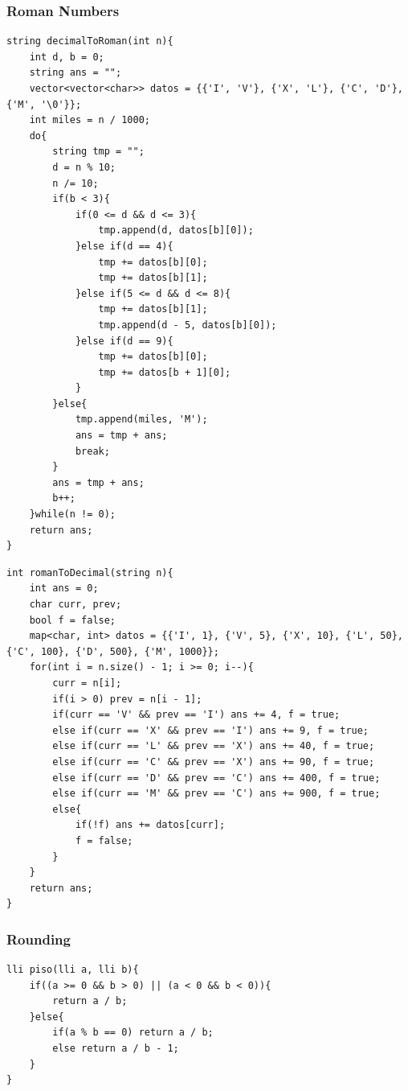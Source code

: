 \documentclass[twoside]{article}
\begin{document}
\begin{multicols*}{2}
\begin{verbatim}
\end{verbatim}

\subsubsectionfont{\large\bfseries\sffamily\underline}
\subsubsection*{Roman Numbers}
\begin{verbatim}
string decimalToRoman(int n){
	int d, b = 0;
	string ans = "";
	vector<vector<char>> datos = {{'I', 'V'}, {'X', 'L'}, {'C', 'D'}, {'M', '\0'}};
	int miles = n / 1000;
	do{
		string tmp = "";
		d = n % 10;
		n /= 10;
		if(b < 3){
			if(0 <= d && d <= 3){
				tmp.append(d, datos[b][0]);
			}else if(d == 4){
				tmp += datos[b][0];
				tmp += datos[b][1];
			}else if(5 <= d && d <= 8){
				tmp += datos[b][1];
				tmp.append(d - 5, datos[b][0]);
			}else if(d == 9){
				tmp += datos[b][0];
				tmp += datos[b + 1][0];
			}
		}else{
			tmp.append(miles, 'M');
			ans = tmp + ans;
			break;
		}
		ans = tmp + ans;
		b++;
	}while(n != 0);
	return ans;
}

\end{verbatim}
\vspace{-12pt}
\begin{verbatim}
int romanToDecimal(string n){
	int ans = 0;
	char curr, prev;
	bool f = false;
	map<char, int> datos = {{'I', 1}, {'V', 5}, {'X', 10}, {'L', 50}, {'C', 100}, {'D', 500}, {'M', 1000}};
	for(int i = n.size() - 1; i >= 0; i--){
		curr = n[i];
		if(i > 0) prev = n[i - 1];
		if(curr == 'V' && prev == 'I') ans += 4, f = true;
		else if(curr == 'X' && prev == 'I') ans += 9, f = true;
		else if(curr == 'L' && prev == 'X') ans += 40, f = true;
		else if(curr == 'C' && prev == 'X') ans += 90, f = true;
		else if(curr == 'D' && prev == 'C') ans += 400, f = true;
		else if(curr == 'M' && prev == 'C') ans += 900, f = true;
		else{
			if(!f) ans += datos[curr];
			f = false;
		}
	}
	return ans;
}

\end{verbatim}

\subsubsectionfont{\large\bfseries\sffamily\underline}
\subsubsection*{Rounding}
\begin{verbatim}
lli piso(lli a, lli b){
	if((a >= 0 && b > 0) || (a < 0 && b < 0)){
		return a / b;
	}else{
		if(a % b == 0) return a / b;
		else return a / b - 1;
	}
}


\end{verbatim}
\end{multicols*}
\end{document}
